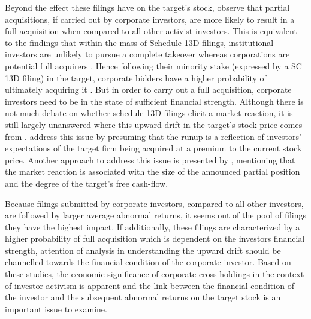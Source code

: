\documentclass[12pt]{article}
\begin{document}
Beyond the effect these filings have on the target's stock, \citet{Akhigbe2007} observe that partial acquisitions, if carried out by corporate investors, are more likely to result in a full acquisition when compared to all other activist investors. This is equivalent to the findings that within the mass of Schedule 13D filings, institutional investors are unlikely to pursue a complete takeover whereas corporations are potential full acquirers \citep{Brigida2012}. Hence following their minority stake (expressed by a SC 13D filing) in the target, corporate bidders have a higher probability of ultimately acquiring it \citep{Greenwood2009}. But in order to carry out a full acquisition, corporate investors need to be in the state of sufficient financial strength. 
Although there is not much debate on whether schedule 13D filings elicit a market reaction, it is still largely unanswered where this upward drift in the target's stock price comes from \citep{Greenwood2009}. \citet{Greenwood2009} address this issue by presuming that the runup is a reflection of investors' expectations of the target firm being acquired at a premium to the current stock price. Another approach to address this issue is presented by \citet{Akhigbe2007}, mentioning that the market reaction is associated with the size of the announced partial position and the degree of the target's free cash-flow. 

Because filings submitted by corporate investors, compared to all other investors, are followed by larger average abnormal returns, it seems  out of the pool of filings they have the highest impact. If additionally, these filings are characterized by a higher probability of full acquisition which is dependent on the investors financial strength, attention of analysis in understanding the upward drift should be channelled towards the financial condition of the corporate investor. 
Based on these studies, the economic significance of corporate cross-holdings in the context of investor activism is apparent and the link between the financial condition of the investor and the subsequent abnormal returns on the target stock is an important issue to examine. 
\end{document}
